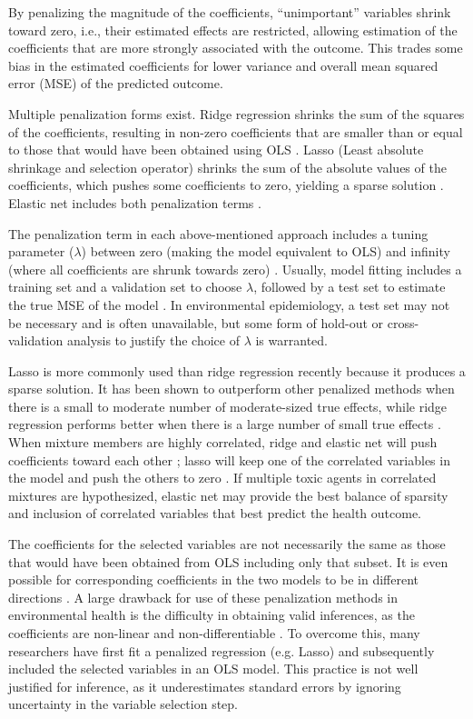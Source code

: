 By penalizing the magnitude of the coefficients, ``unimportant'' variables shrink toward zero, i.e., their estimated effects are restricted, allowing estimation of the coefficients that are more strongly associated with the outcome. This trades some bias in the estimated coefficients for lower variance and overall mean squared error (MSE) of the predicted outcome.

Multiple penalization forms exist. Ridge regression shrinks the sum of the squares of the coefficients, resulting in non-zero coefficients that are smaller than or equal to those that would have been obtained using OLS \citep{hoerl1970ridge}. Lasso (Least absolute shrinkage and selection operator) shrinks the sum of the absolute values of the coefficients, which pushes some coefficients to zero, yielding a sparse solution \citep{tibshirani96}. Elastic net includes both penalization terms \citep{zou05}.

The penalization term in each above-mentioned approach includes a tuning parameter ($\lambda$) between zero (making the model equivalent to OLS) and infinity (where all coefficients are shrunk towards zero) \citep{friedman2001elements, ISLR}. Usually, model fitting includes a training set and a validation set to choose $\lambda$, followed by a test set to estimate the true MSE of the model \citep{daume2012course}. In environmental epidemiology, a test set may not be necessary and is often unavailable, but some form of hold-out or cross-validation analysis to justify the choice of $\lambda$ is warranted.

Lasso is more commonly used than ridge regression recently because it produces a sparse solution. It has been shown to outperform other penalized methods when there is a small to moderate number of moderate-sized true effects, while ridge regression performs better when there is a large number of small true effects \citep{tibshirani96}. When mixture members are highly correlated, ridge and elastic net will push coefficients toward each other \citep{zou05, hoerl1970ridge}; lasso will keep one of the correlated variables in the model and push the others to zero \citep{tibshirani96}. If multiple toxic agents in correlated mixtures are hypothesized, elastic net may provide the best balance of sparsity and inclusion of correlated variables that best predict the health outcome.

The coefficients for the selected variables are not necessarily the same as those that would have been obtained from OLS including only that subset. It is even possible for corresponding coefficients in the two models to be in different directions \citep{tibshirani96}. A large drawback for use of these penalization methods in environmental health is the difficulty in obtaining valid inferences, as the coefficients are non-linear and non-differentiable \citep{tibshirani96}. To overcome this, many researchers have first fit a penalized regression (e.g. Lasso) and subsequently included the selected variables in an OLS model. This practice is not well justified for inference, as it underestimates standard errors by ignoring uncertainty in the variable selection step.

